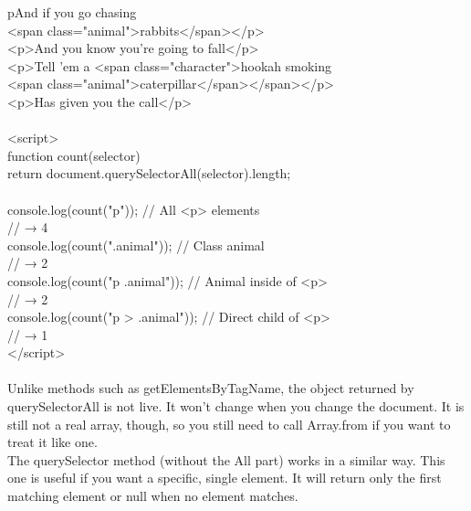 \documentclass[10pt,a4paper]{article}
\begin{document}
\<p\>And if you go chasing\\
  <span class="animal">rabbits</span></p>\\
<p>And you know you're going to fall</p>\\
<p>Tell 'em a <span class="character">hookah smoking\\
  <span class="animal">caterpillar</span></span></p>\\
<p>Has given you the call</p>\\
\\
<script>\\
  function count(selector) {\\
    return document.querySelectorAll(selector).length;\\
  }\\
  console.log(count("p"));           // All <p> elements\\
  // → 4\\
  console.log(count(".animal"));     // Class animal\\
  // → 2\\
  console.log(count("p .animal"));   // Animal inside of <p>\\
  // → 2\\
  console.log(count("p > .animal")); // Direct child of <p>\\
  // → 1\\
</script>\\
\\
Unlike methods such as getElementsByTagName, the object returned by querySelectorAll is not live. It won’t change when you change the document. It is still not a real array, though, so you still need to call Array.from if you want to treat it like one.\\

The querySelector method (without the All part) works in a similar way. This one is useful if you want a specific, single element. It will return only the first matching element or null when no element matches.\\
\end{document}
